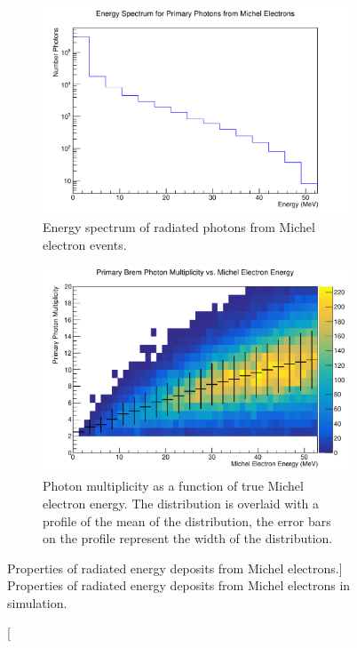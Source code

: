 \begin{figure}

	\centering

	\begin{subfigure}[b]{\textwidth}
		\includegraphics[width=\textwidth]{figures/photon_spec.pdf}
		\caption{Energy spectrum of radiated photons from Michel electron events.}
		\label{fig:photon_spec}
	\end{subfigure}

	\vspace{5mm}

	\begin{subfigure}[b]{\textwidth}
		\includegraphics[width=\textwidth]{figures/photon_mult.pdf}
		\caption{Photon multiplicity as a function of true Michel electron energy.
		The distribution is overlaid with a profile of the mean of the distribution,
		the error bars on the profile represent the width of the distribution.}
		\label{fig:photon_mult}
	\end{subfigure}

	\caption
	[Properties of radiated energy deposits from Michel electrons.]
	{Properties of radiated energy deposits from Michel electrons in \protodune{}
	simulation.} 

	\label{fig:photon_prop}

\end{figure}

